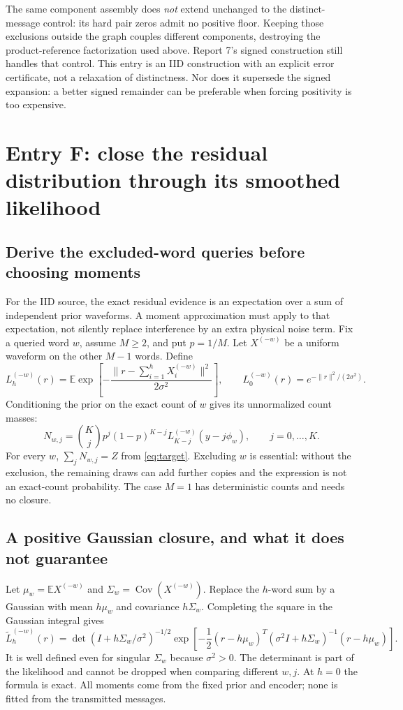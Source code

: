 \documentclass[10pt,a4paper]{article}
\newcommand{\E}{\mathbb E}
\begin{document}
The same component assembly does \emph{not} extend unchanged to the distinct-message control: its hard
pair zeros admit no positive floor. Keeping those exclusions outside the graph couples different components,
destroying the product-reference factorization used above. Report 7's signed construction still handles
that control. This entry is an IID construction with an explicit error certificate, not a relaxation of
distinctness. Nor does it supersede the signed expansion: a better signed remainder can be preferable
when forcing positivity is too expensive.

\clearpage
\section{Entry F: close the residual distribution through its smoothed likelihood}
\label{sec:residual-closure}
\subsection{Derive the excluded-word queries before choosing moments}
For the IID source, the exact residual evidence is an expectation over a sum of independent prior
waveforms. A moment approximation must apply to that expectation, not silently replace interference by
an extra physical noise term. Fix a queried word $w$, assume $M\geq2$, and put $p=1/M$.
Let $X^{(-w)}$ be a uniform waveform on the other $M-1$ words. Define
\[
 L_h^{(-w)}(r)=
 \E\exp\!\left[-\frac{\|r-\sum_{i=1}^hX_i^{(-w)}\|^2}{2\sigma^2}\right],
 \qquad L_0^{(-w)}(r)=e^{-\|r\|^2/(2\sigma^2)}.
\]
Conditioning the prior on the exact count of $w$ gives its unnormalized count masses:
\begin{equation}
 N_{w,j}=\binom Kj p^j(1-p)^{K-j}
       L_{K-j}^{(-w)}(y-j\phi_w),\qquad j=0,\ldots,K.
 \label{eq:residual-count-mass}
\end{equation}
For every $w$, $\sum_jN_{w,j}=Z$ from \eqref{eq:target}. Excluding $w$ is essential: without the exclusion,
the remaining draws can add further copies and the expression is not an exact-count probability.
The case $M=1$ has deterministic counts and needs no closure.

\subsection{A positive Gaussian closure, and what it does not guarantee}
Let $\mu_w=\E X^{(-w)}$ and $\Sigma_w=\operatorname{Cov}(X^{(-w)})$. Replace the $h$-word sum by a
Gaussian with mean $h\mu_w$ and covariance $h\Sigma_w$. Completing the square in the Gaussian integral gives
\begin{equation}
 \widetilde L_h^{(-w)}(r)
 =\det(I+h\Sigma_w/\sigma^2)^{-1/2}
   \exp\!\left[-\frac12(r-h\mu_w)^T
     (\sigma^2I+h\Sigma_w)^{-1}(r-h\mu_w)\right].
 \label{eq:gaussian-residual}
\end{equation}
It is well defined even for singular $\Sigma_w$ because $\sigma^2>0$. The determinant is part of the
likelihood and cannot be dropped when comparing different $w,j$. At $h=0$ the formula is exact.
All moments come from the fixed prior and encoder; none is fitted from the transmitted messages.
\end{document}
